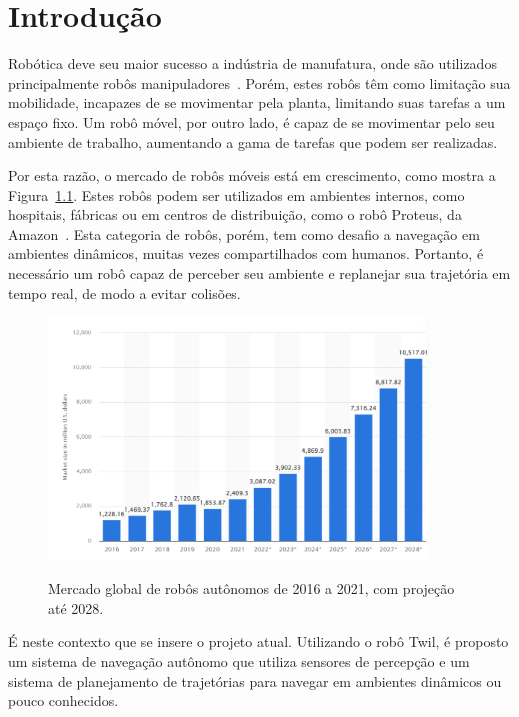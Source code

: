 \documentclass[repeatfields,xlists,xpacks,oneside,yearsonly]{ufrgscca}
\begin{document}
\tableofcontents

\chapter{Introdução}

Robótica deve seu maior sucesso a indústria de manufatura, onde são utilizados
principalmente robôs manipuladores~\cite{IntroductionToMobileRobots}.
Porém, estes robôs têm como limitação sua mobilidade, incapazes de se movimentar
pela planta, limitando suas tarefas a um espaço fixo.
Um robô móvel, por outro lado, é capaz de se movimentar pelo seu ambiente de
trabalho, aumentando a gama de tarefas que podem ser realizadas.

Por esta razão, o mercado de robôs móveis está em crescimento, como mostra a
Figura~\ref{fig:mercado_robo}.
Estes robôs podem ser utilizados em ambientes internos, como hospitais, fábricas
ou em centros de distribuição, como o robô Proteus, da Amazon~\cite{amazon_robot}.
Esta categoria de robôs, porém, tem como desafio a navegação em ambientes dinâmicos,
muitas vezes compartilhados com humanos.
Portanto, é necessário um robô capaz de perceber seu ambiente e replanejar sua
trajetória em tempo real, de modo a evitar colisões.

\begin{figure}[htbp]
    {
        \centering
        \caption{Mercado global de robôs autônomos de 2016 a 2021, com projeção até 2028.}
        \label{fig:mercado_robo}
        \includegraphics[width=0.9\textwidth]{mercado_robo}\\
    }
    {}
\end{figure}

É neste contexto que se insere o projeto atual.
Utilizando o robô Twil, é proposto um sistema de navegação autônomo que utiliza
sensores de percepção e um sistema de planejamento de trajetórias para navegar
em ambientes dinâmicos ou pouco conhecidos.
\end{document}
